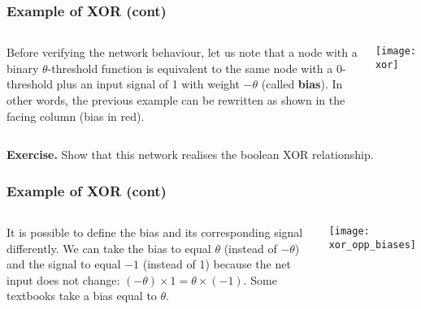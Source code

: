 %
\begin{frame}
\frametitle{Example of XOR (cont)}
\label{xor_graph}

\begin{columns}[c]

    Before verifying the network behaviour, let us note that a node
    with a binary \(\theta\)-threshold function is equivalent to the
    same node with a 0-threshold plus an input signal of 1 with weight
    \(-\theta\) (called \textbf{bias}). In other words, the previous
    example can be rewritten as shown in the facing column (bias in
    red).

    \begin{center}
      \texttt{[image: xor]}
    \end{center}
    
\end{columns}

\bigskip

\textbf{Exercise.} Show that this network realises the boolean XOR
relationship.

\end{frame}

%
\begin{frame}
\frametitle{Example of XOR (cont)}

\begin{columns}[c]

   It is possible to define the bias and its
  corresponding signal differently. We can take the bias to equal
  \(\theta\) (instead of \(-\theta\)) and the signal to equal \(-1\)
  (instead of 1) because the net input does not change: \((-\theta)
  \times 1 = \theta \times (-1)\). Some textbooks take a bias equal to
  \(\theta\).

    \begin{center}
      \texttt{[image: xor\_opp\_biases]}
    \end{center}

\end{columns}

\end{frame}

